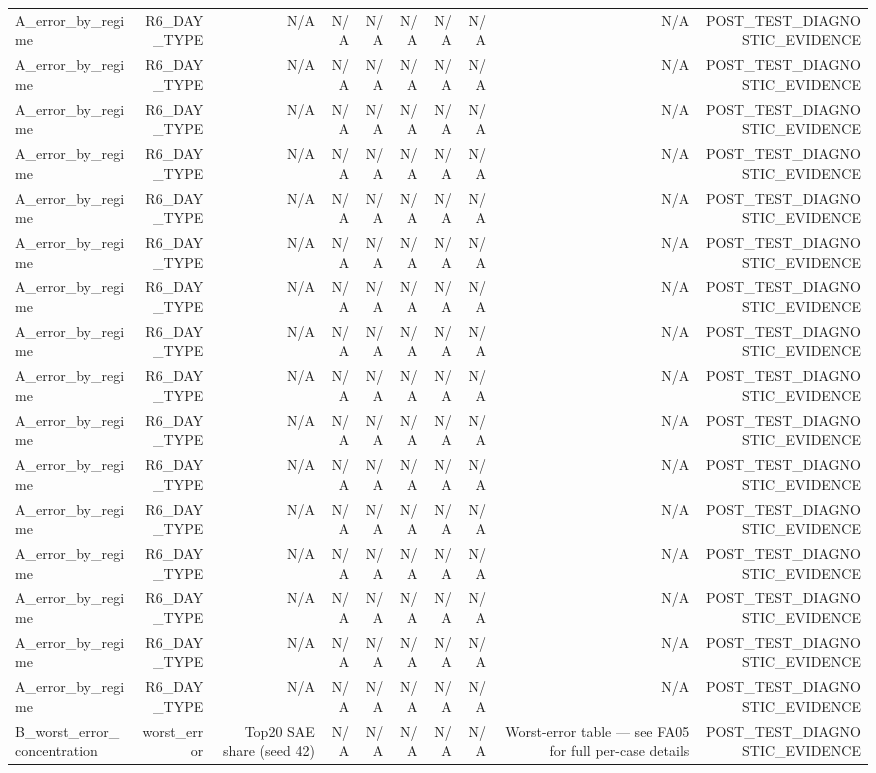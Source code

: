 \begin{table}[h!]
\begin{tabular}{lrrrrrrrrr}
A\_error\_by\_regime & R6\_DAY\_TYPE & N/A & N/A & N/A & N/A & N/A & N/A & N/A & POST\_TEST\_DIAGNOSTIC\_EVIDENCE \\
A\_error\_by\_regime & R6\_DAY\_TYPE & N/A & N/A & N/A & N/A & N/A & N/A & N/A & POST\_TEST\_DIAGNOSTIC\_EVIDENCE \\
A\_error\_by\_regime & R6\_DAY\_TYPE & N/A & N/A & N/A & N/A & N/A & N/A & N/A & POST\_TEST\_DIAGNOSTIC\_EVIDENCE \\
A\_error\_by\_regime & R6\_DAY\_TYPE & N/A & N/A & N/A & N/A & N/A & N/A & N/A & POST\_TEST\_DIAGNOSTIC\_EVIDENCE \\
A\_error\_by\_regime & R6\_DAY\_TYPE & N/A & N/A & N/A & N/A & N/A & N/A & N/A & POST\_TEST\_DIAGNOSTIC\_EVIDENCE \\
A\_error\_by\_regime & R6\_DAY\_TYPE & N/A & N/A & N/A & N/A & N/A & N/A & N/A & POST\_TEST\_DIAGNOSTIC\_EVIDENCE \\
A\_error\_by\_regime & R6\_DAY\_TYPE & N/A & N/A & N/A & N/A & N/A & N/A & N/A & POST\_TEST\_DIAGNOSTIC\_EVIDENCE \\
A\_error\_by\_regime & R6\_DAY\_TYPE & N/A & N/A & N/A & N/A & N/A & N/A & N/A & POST\_TEST\_DIAGNOSTIC\_EVIDENCE \\
A\_error\_by\_regime & R6\_DAY\_TYPE & N/A & N/A & N/A & N/A & N/A & N/A & N/A & POST\_TEST\_DIAGNOSTIC\_EVIDENCE \\
A\_error\_by\_regime & R6\_DAY\_TYPE & N/A & N/A & N/A & N/A & N/A & N/A & N/A & POST\_TEST\_DIAGNOSTIC\_EVIDENCE \\
A\_error\_by\_regime & R6\_DAY\_TYPE & N/A & N/A & N/A & N/A & N/A & N/A & N/A & POST\_TEST\_DIAGNOSTIC\_EVIDENCE \\
A\_error\_by\_regime & R6\_DAY\_TYPE & N/A & N/A & N/A & N/A & N/A & N/A & N/A & POST\_TEST\_DIAGNOSTIC\_EVIDENCE \\
A\_error\_by\_regime & R6\_DAY\_TYPE & N/A & N/A & N/A & N/A & N/A & N/A & N/A & POST\_TEST\_DIAGNOSTIC\_EVIDENCE \\
A\_error\_by\_regime & R6\_DAY\_TYPE & N/A & N/A & N/A & N/A & N/A & N/A & N/A & POST\_TEST\_DIAGNOSTIC\_EVIDENCE \\
A\_error\_by\_regime & R6\_DAY\_TYPE & N/A & N/A & N/A & N/A & N/A & N/A & N/A & POST\_TEST\_DIAGNOSTIC\_EVIDENCE \\
A\_error\_by\_regime & R6\_DAY\_TYPE & N/A & N/A & N/A & N/A & N/A & N/A & N/A & POST\_TEST\_DIAGNOSTIC\_EVIDENCE \\
B\_worst\_error\_concentration & worst\_error & Top20 SAE share (seed 42) & N/A & N/A & N/A & N/A & N/A & Worst-error table — see FA05 for full per-case details & POST\_TEST\_DIAGNOSTIC\_EVIDENCE \\

\end{tabular}
\end{table}
